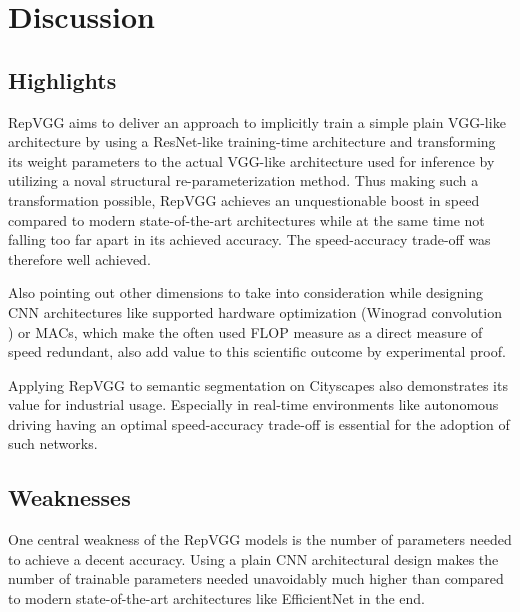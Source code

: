 \section{Discussion} \label{discussion}

\subsection{Highlights}

RepVGG aims to deliver an approach to implicitly train a simple plain VGG-like architecture by using a ResNet-like training-time architecture and transforming its weight parameters to the actual VGG-like architecture used for inference by utilizing a noval structural re-parameterization method. Thus making such a transformation possible, RepVGG achieves an unquestionable boost in speed compared to modern state-of-the-art architectures while at the same time not falling too far apart in its achieved accuracy. The speed-accuracy trade-off was therefore well achieved. 

Also pointing out other dimensions to take into consideration while designing CNN architectures like supported hardware optimization (Winograd convolution \cite{AndrewLavin.2015}) or MACs, which make the often used FLOP measure as a direct measure of speed redundant, also add value to this scientific outcome by experimental proof.

Applying RepVGG to semantic segmentation on Cityscapes \cite{MariusCordts.2016} also demonstrates its value for industrial usage. Especially in real-time environments like autonomous driving having an optimal speed-accuracy trade-off is essential for the adoption of such networks. 

\subsection{Weaknesses}

One central weakness of the RepVGG models is the number of parameters needed to achieve a decent accuracy. Using a plain CNN architectural design makes the number of trainable parameters needed unavoidably much higher than compared to modern state-of-the-art architectures like EfficientNet in the end.  

